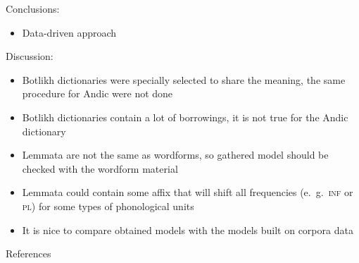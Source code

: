 \documentclass[13pt, t]{beamer}
\begin{document}
\begin{frame}
\begin{block}{Conclusions:}
\begin{itemize}
\item Data-driven approach
\end{itemize}
\end{block}
\begin{block}{Discussion:}
\begin{itemize}
\item Botlikh dictionaries were specially selected to share the meaning, the same procedure for Andic were not done
\item Botlikh dictionaries contain a lot of borrowings, it is not true for the Andic dictionary
\item Lemmata are not the same as wordforms, so gathered model should be checked with the wordform material
\item Lemmata could contain some affix that will shift all frequencies (e.~g.~\textsc{inf} or \textsc{pl}) for some types of phonological units
\item It is nice to compare obtained models with the models built on corpora data
\end{itemize}
\end{block}
\end{frame}



\begin{frame}{References}
\footnotesize


\end{frame}
\end{document}
